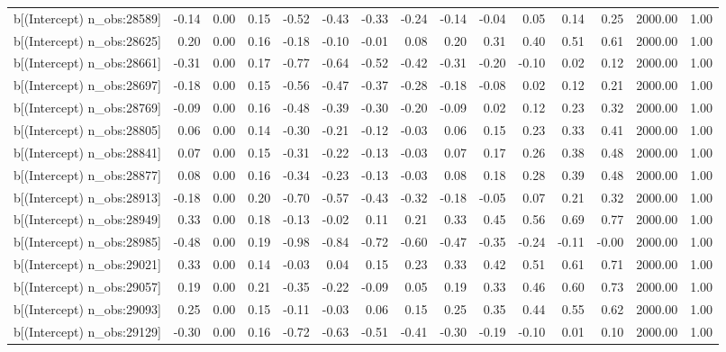 \begin{table}[ht]
\begin{tabular}{rrrrrrrrrrrrrrr}
  b[(Intercept) n\_obs:28589] & -0.14 & 0.00 & 0.15 & -0.52 & -0.43 & -0.33 & -0.24 & -0.14 & -0.04 & 0.05 & 0.14 & 0.25 & 2000.00 & 1.00 \\ 
  b[(Intercept) n\_obs:28625] & 0.20 & 0.00 & 0.16 & -0.18 & -0.10 & -0.01 & 0.08 & 0.20 & 0.31 & 0.40 & 0.51 & 0.61 & 2000.00 & 1.00 \\ 
  b[(Intercept) n\_obs:28661] & -0.31 & 0.00 & 0.17 & -0.77 & -0.64 & -0.52 & -0.42 & -0.31 & -0.20 & -0.10 & 0.02 & 0.12 & 2000.00 & 1.00 \\ 
  b[(Intercept) n\_obs:28697] & -0.18 & 0.00 & 0.15 & -0.56 & -0.47 & -0.37 & -0.28 & -0.18 & -0.08 & 0.02 & 0.12 & 0.21 & 2000.00 & 1.00 \\ 
  b[(Intercept) n\_obs:28769] & -0.09 & 0.00 & 0.16 & -0.48 & -0.39 & -0.30 & -0.20 & -0.09 & 0.02 & 0.12 & 0.23 & 0.32 & 2000.00 & 1.00 \\ 
  b[(Intercept) n\_obs:28805] & 0.06 & 0.00 & 0.14 & -0.30 & -0.21 & -0.12 & -0.03 & 0.06 & 0.15 & 0.23 & 0.33 & 0.41 & 2000.00 & 1.00 \\ 
  b[(Intercept) n\_obs:28841] & 0.07 & 0.00 & 0.15 & -0.31 & -0.22 & -0.13 & -0.03 & 0.07 & 0.17 & 0.26 & 0.38 & 0.48 & 2000.00 & 1.00 \\ 
  b[(Intercept) n\_obs:28877] & 0.08 & 0.00 & 0.16 & -0.34 & -0.23 & -0.13 & -0.03 & 0.08 & 0.18 & 0.28 & 0.39 & 0.48 & 2000.00 & 1.00 \\ 
  b[(Intercept) n\_obs:28913] & -0.18 & 0.00 & 0.20 & -0.70 & -0.57 & -0.43 & -0.32 & -0.18 & -0.05 & 0.07 & 0.21 & 0.32 & 2000.00 & 1.00 \\ 
  b[(Intercept) n\_obs:28949] & 0.33 & 0.00 & 0.18 & -0.13 & -0.02 & 0.11 & 0.21 & 0.33 & 0.45 & 0.56 & 0.69 & 0.77 & 2000.00 & 1.00 \\ 
  b[(Intercept) n\_obs:28985] & -0.48 & 0.00 & 0.19 & -0.98 & -0.84 & -0.72 & -0.60 & -0.47 & -0.35 & -0.24 & -0.11 & -0.00 & 2000.00 & 1.00 \\ 
  b[(Intercept) n\_obs:29021] & 0.33 & 0.00 & 0.14 & -0.03 & 0.04 & 0.15 & 0.23 & 0.33 & 0.42 & 0.51 & 0.61 & 0.71 & 2000.00 & 1.00 \\ 
  b[(Intercept) n\_obs:29057] & 0.19 & 0.00 & 0.21 & -0.35 & -0.22 & -0.09 & 0.05 & 0.19 & 0.33 & 0.46 & 0.60 & 0.73 & 2000.00 & 1.00 \\ 
  b[(Intercept) n\_obs:29093] & 0.25 & 0.00 & 0.15 & -0.11 & -0.03 & 0.06 & 0.15 & 0.25 & 0.35 & 0.44 & 0.55 & 0.62 & 2000.00 & 1.00 \\ 
  b[(Intercept) n\_obs:29129] & -0.30 & 0.00 & 0.16 & -0.72 & -0.63 & -0.51 & -0.41 & -0.30 & -0.19 & -0.10 & 0.01 & 0.10 & 2000.00 & 1.00 \\ 

\end{tabular}
\end{table}
